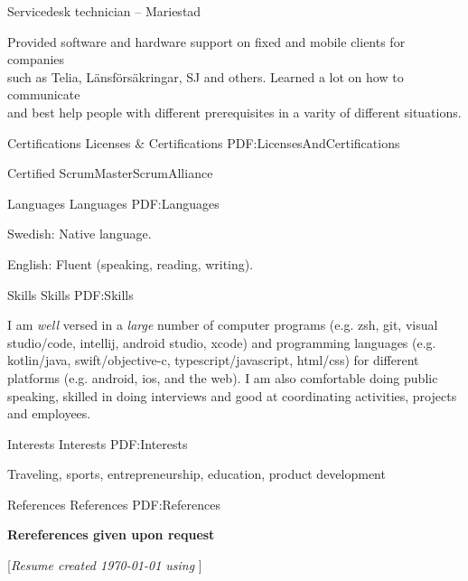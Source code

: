 \documentclass[letterpaper,MMMyyyy,nonstopmode]{simpleresumecv}
\newcommand{\CVNote}{Resume created {\today} using {\XeLaTeX}}
\begin{document}
\begin{Body}
\Gap
\BulletItem
Servicedesk technician
\hfill
{} --
\newline
Mariestad
\begin{Detail}
\SubBulletItem
Provided software and hardware support on fixed and mobile clients for companies\\ such as Telia, Länsförsäkringar, SJ and others. Learned a lot on how to communicate\\ and best help people with different prerequisites in a varity of different situations.
\end{Detail}



\Section
{Certifications}
{Licenses \& Certifications}
{PDF:LicensesAndCertifications}

\BulletItem
Certified ScrumMaster\newline ScrumAlliance
\hfill
{}


\Section
{Languages}
{Languages}
{PDF:Languages}

\BulletItem
Swedish: Native language.

\Gap
\BulletItem
English: Fluent (speaking, reading, writing).


\Section
{Skills}
{Skills}
{PDF:Skills}

\Entry
I am \emph{well} versed in a \emph{large} number of computer programs (e.g. zsh, git, visual studio/code, intellij, android studio, xcode) and programming languages (e.g. kotlin/java, swift/objective-c, typescript/javascript, html/css) for different platforms (e.g. android, ios, and the web). I am also comfortable doing public speaking, skilled in doing interviews and good at coordinating activities, projects and employees.


\Section
{Interests}
{Interests}
{PDF:Interests}

\Entry
Traveling, sports, entrepreneurship, education, product development


\Section
{References}
{References}
{PDF:References}

\BulletItem
\textbf{Rereferences given upon request}

\end{Body}


\BigGap
\UseNoteFont%
\null\hfill%
[\textit{\CVNote}]
\end{document}
